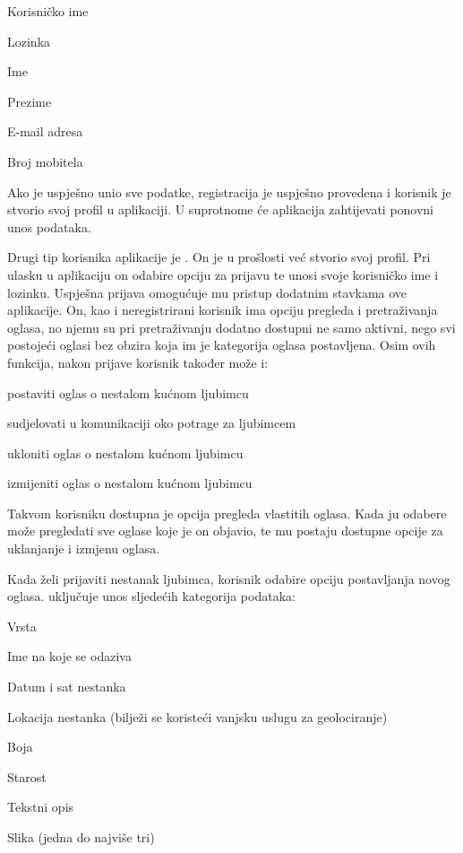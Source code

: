 		\begin{packed_item}
			
			\item  Korisničko ime
			\item  Lozinka
			\item  Ime
			\item  Prezime
			\item  E-mail adresa
			\item  Broj mobitela
			
		\end{packed_item}

		Ako je uspješno unio sve podatke, registracija je uspješno provedena i korisnik je stvorio svoj profil u aplikaciji. U suprotnome će aplikacija zahtijevati ponovni unos podataka.

Drugi tip korisnika aplikacije je . On je u prošlosti već stvorio svoj profil. Pri ulasku u aplikaciju on odabire opciju za prijavu te unosi svoje korisničko ime i lozinku. Uspješna prijava omogućuje mu pristup dodatnim stavkama ove aplikacije. On, kao i neregistrirani korisnik ima opciju pregleda i pretraživanja oglasa, no njemu su pri pretraživanju dodatno dostupni ne samo aktivni, nego svi postojeći oglasi bez obzira koja im je kategorija oglasa postavljena. Osim ovih funkcija, nakon prijave korisnik također može i:

		\begin{packed_enum}
			
			\item  postaviti oglas o nestalom kućnom ljubimcu 
			\item  sudjelovati u komunikaciji oko potrage za ljubimcem 
			\item  ukloniti oglas o nestalom kućnom ljubimcu 
			\item  izmijeniti oglas o nestalom kućnom ljubimcu 
			
		\end{packed_enum}

		Takvom korisniku dostupna je opcija pregleda vlastitih oglasa. Kada ju odabere može pregledati sve oglase koje je on objavio, te mu postaju dostupne opcije za uklanjanje i izmjenu oglasa.

		Kada želi prijaviti nestanak ljubimca, korisnik odabire opciju postavljanja novog oglasa.  uključuje unos sljedećih kategorija podataka:

		\begin{packed_item}
			
			\item  Vrsta
			\item  Ime na koje se odaziva
			\item  Datum i sat nestanka
			\item  Lokacija nestanka (bilježi se koristeći vanjsku uslugu za geolociranje)
			\item  Boja
			\item  Starost
			\item  Tekstni opis
			\item  Slika (jedna do najviše tri)
			
		\end{packed_item}


